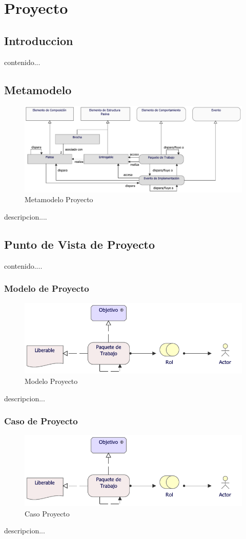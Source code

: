 \chapter{Proyecto}
\section{Introduccion}
contenido...

\newpage

\section{Metamodelo}
\begin{figure}[h!]
	\centering
	\includegraphics[width=0.9\linewidth]{imgs/meta/Proyecto}
	\caption{Metamodelo Proyecto}
\end{figure}

descripcion....

\newpage

\section{Punto de Vista de Proyecto}
contenido....
\subsection{Modelo de Proyecto}
\begin{figure}[h!]
	\centering
	\includegraphics[width=.9\linewidth]{imgs/modelo/Proyecto}
	\caption{Modelo Proyecto}
\end{figure}
descripcion...

\newpage

\subsection{Caso  de Proyecto}
\begin{figure}[h!]
	\centering
	\includegraphics[width=.9\linewidth]{imgs/caso/Proyecto}
	\caption{Caso Proyecto}
\end{figure}
descripcion...

\newpage